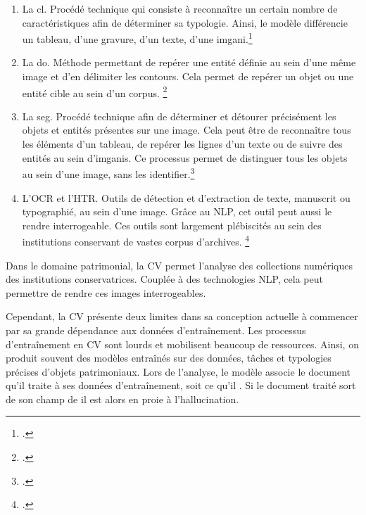 \begin{enumerate}
	
	\item La \gls{cl}. Procédé technique qui consiste à reconnaître un certain nombre de caractéristiques afin de déterminer sa typologie. Ainsi, le modèle différencie un tableau, d'une gravure, d'un texte, d'une \gls{imgani}.\footcite{QuestceQueVision}
	
	\item La \gls{do}. Méthode permettant de repérer une entité définie au sein d'une même image et d'en délimiter les contours. Cela permet de repérer un objet ou une entité cible au sein d'un corpus. \footcite{QuestceQueVision}
	
	\item La \gls{seg}. Procédé technique afin de déterminer et détourer précisément les objets et entités présentes sur une image. Cela peut être de reconnaître tous les éléments d'un tableau, de repérer les lignes d'un texte ou de suivre des entités au sein d'\glspl{imgani}. Ce processus permet de distinguer tous les objets au sein d'une image, sans les identifier.\footcite{QuestceQueVision}
	
	\item L'{\gls{OCR}} et l'{\gls{HTR}}. Outils de détection et d'extraction de texte, manuscrit ou typographié, au sein d'une image. Grâce au \gls{NLP}, cet outil peut aussi le rendre interrogeable. Ces outils sont largement plébiscités au sein des institutions conservant de vastes corpus d'archives. \footcites{TechniquesFormatsConversion}{IntelligenceArtificielleCollections}
	
\end{enumerate}

Dans le domaine patrimonial, la \gls{CV} permet l'analyse des collections numériques des institutions conservatrices. Couplée à des technologies \gls{NLP}, cela peut permettre de rendre ces images interrogeables.

Cependant, la \gls{CV} présente deux limites dans sa conception actuelle à commencer par sa grande dépendance aux données d'entraînement. Les processus d'entraînement en \gls{CV} sont lourds et mobilisent beaucoup de ressources. Ainsi, on produit souvent des modèles entraînés sur des données, tâches et typologies précises d'objets patrimoniaux. Lors de l'analyse, le modèle associe le document qu'il traite à ses données d'entraînement, soit ce qu'il . Si le document traité sort de son champ de  il est alors en proie à l'hallucination.

